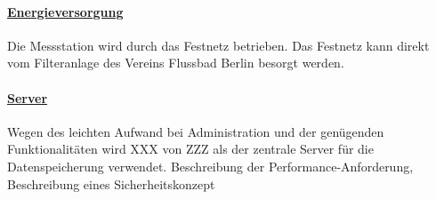 \paragraph{\uline{Energieversorgung}}
Die Messstation wird durch das Festnetz betrieben. Das Festnetz kann direkt vom Filteranlage des Vereins Flussbad Berlin besorgt werden.

\paragraph{\uline{Server}}
Wegen des leichten Aufwand bei Administration und der genügenden Funktionalitäten wird XXX von ZZZ als der zentrale Server für die Datenspeicherung verwendet. Beschreibung der Performance-Anforderung, Beschreibung eines Sicherheitskonzept
